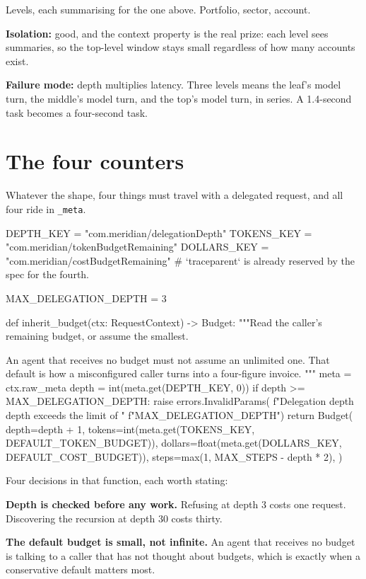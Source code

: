 Levels, each summarising for the one above. Portfolio, sector, account.

\textbf{Isolation:} good, and the context property is the real prize: each level sees summaries, so the top-level window stays small
regardless of how many accounts exist.

\textbf{Failure mode:} depth multiplies latency. Three levels means the leaf's
model turn, the middle's model turn, and the top's model turn, in series. A
1.4-second task becomes a four-second task.

\section{The four counters}

Whatever the shape, four things must travel with a delegated request, and all
four ride in \texttt{\_meta}.

\begin{py}
DEPTH_KEY = "com.meridian/delegationDepth"
TOKENS_KEY = "com.meridian/tokenBudgetRemaining"
DOLLARS_KEY = "com.meridian/costBudgetRemaining"
# `traceparent` is already reserved by the spec for the fourth.

MAX_DELEGATION_DEPTH = 3

def inherit_budget(ctx: RequestContext) -> Budget:
    """Read the caller's remaining budget, or assume the smallest.

    An agent that receives no budget must not assume an unlimited one. That
    default is how a misconfigured caller turns into a four-figure invoice.
    """
    meta = ctx.raw_meta
    depth = int(meta.get(DEPTH_KEY, 0))
    if depth >= MAX_DELEGATION_DEPTH:
        raise errors.InvalidParams(
            f"Delegation depth {depth} exceeds the limit of "
            f"{MAX_DELEGATION_DEPTH}")
    return Budget(
        depth=depth + 1,
        tokens=int(meta.get(TOKENS_KEY, DEFAULT_TOKEN_BUDGET)),
        dollars=float(meta.get(DOLLARS_KEY, DEFAULT_COST_BUDGET)),
        steps=max(1, MAX_STEPS - depth * 2),
    )
\end{py}

Four decisions in that function, each worth stating:

\textbf{Depth is checked before any work.} Refusing at depth 3 costs one request.
Discovering the recursion at depth 30 costs thirty.

\textbf{The default budget is small, not infinite.} An agent that receives no
budget is talking to a caller that has not thought about budgets, which is
exactly when a conservative default matters most.

